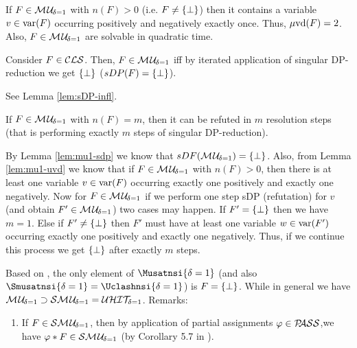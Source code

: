 \documentclass{article}
\begin{document}
\begin{lem}\label{lem:mu1-uvd}
\cite{KleineBuening2000SubclassesMU} If $F \in \mathcal{M\hspace{0.8pt}U}_{\!\delta=1}$ with $n(F) > 0$ (i.e. $F \not = \{ \bot \}$) then it contains a variable $v \in \operatorname{var}(F)$ occurring positively and negatively exactly once. Thus, $\operatorname{\mu\!\operatorname{vd}}(F) = 2$. Also, $F \in \mathcal{M\hspace{0.8pt}U}_{\!\delta=1}$ are solvable in quadratic time.
\end{lem}

\begin{lem}\label{lem:mu1-sdp} Consider $F \in \mathcal{CLS}$. Then, $F \in \mathcal{M\hspace{0.8pt}U}_{\!\delta=1}$ iff by iterated application of singular DP-reduction we get $\{ \bot \}$ ($sDP(F) =\{ \bot \}$). 
\end{lem}
\begin{prf}
See Lemma \ref{lem:sDP-infl}.
\end{prf}

\begin{lem}\label{lem:mu1-refu-tree}
If $F \in \mathcal{M\hspace{0.8pt}U}_{\!\delta=1}$ with $n(F)=m$, then it can be refuted in $m$ resolution steps (that is performing exactly $m$ steps of singular DP-reduction).
\end{lem}
\begin{prf}
By Lemma \ref{lem:mu1-sdp} we know that $sDF(\mathcal{M\hspace{0.8pt}U}_{\!\delta=1})=\{ \bot \}$. Also, from Lemma \ref{lem:mu1-uvd} we know that if $F \in \mathcal{M\hspace{0.8pt}U}_{\!\delta=1}$ with $n(F) > 0$, then there is at least one variable $v \in \operatorname{var}(F)$ occurring exactly one positively and exactly one negatively. Now for $F \in \mathcal{M\hspace{0.8pt}U}_{\!\delta=1}$ if we perform one step sDP (refutation) for $v$ (and obtain $F' \in \mathcal{M\hspace{0.8pt}U}_{\!\delta=1}$) two cases may happen. If $F' =\{ \bot \}$ then we have $m=1$. Else if $F' \not = \{ \bot \}$ then $F'$ must have at least one variable $w \in \operatorname{var}(F')$ occurring exactly one positively and exactly one negatively. Thus, if we continue this process we get $\{ \bot \}$ after exactly $m$ steps. 
\end{prf}

\begin{lem}\label{lem:mu1-sma-uhit}
Based on \cite{KullmannZhao2010Extremal}, the only element of $\Musatnsi{\delta=1}$ (and also $\Smusatnsi{\delta=1} = \Uclashnsi{\delta=1}$) is $F=\{ \bot \}$. While in general we have $\mathcal{M\hspace{0.8pt}U}_{\!\delta=1} \supset \mathcal{S}\mathcal{M\hspace{0.8pt}U}_{\!\delta=1} = \mathcal{U}\mathcal{HIT}_{\!\!\delta=1}$.
Remarks:
  \begin{enumerate}
  \item If $F \in \mathcal{S}\mathcal{M\hspace{0.8pt}U}_{\!\delta=1}$, then by application of partial assignments $\varphi \in \mathcal{P\hspace{-0.32em}ASS}$,we have $\varphi * F \in \mathcal{S}\mathcal{M\hspace{0.8pt}U}_{\!\delta=1}$ (by Corollary 5.7 in \cite{GwynneKullmann2013GoodRepresentations}).
  \end{enumerate} 
\end{lem}
\end{document}
